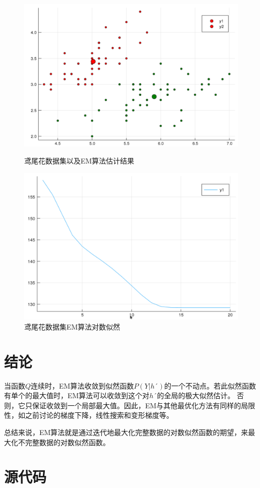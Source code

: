 \documentclass{ML}
\begin{document}
\begin{figure}[H]
	\begin{minipage}[c]{0.5\linewidth}
		\centering
		\includegraphics[width=0.9\linewidth]{media/GMM/iris}
		\caption{鸢尾花数据集以及EM算法估计结果}
		\label{fig:iris-em}
	\end{minipage}
	\begin{minipage}[c]{0.5\linewidth}
		\centering
		\includegraphics[width=0.9\linewidth]{media/GMM/iris-loss}
		\caption{鸢尾花数据集EM算法对数似然}
		\label{fig:iris-em-loss}
	\end{minipage}
\end{figure}

\section{结论}

当函数$Q$连续时，EM算法收敛到似然函数$P(Y|h´)$的一个不动点。若此似然函数有单个的最大值时，EM算法可以收敛到这个对$h´$的全局的极大似然估计。
否则，它只保证收敛到一个局部最大值。因此，EM与其他最优化方法有同样的局限性，如之前讨论的梯度下降，线性搜索和变形梯度等。

总结来说，EM算法就是通过迭代地最大化完整数据的对数似然函数的期望，来最大化不完整数据的对数似然函数。

\appendix

\section{源代码}

\inputminted[breaklines=true,frame=lines,mathescape=true]{julia}{../GMM.jl}
\end{document}
